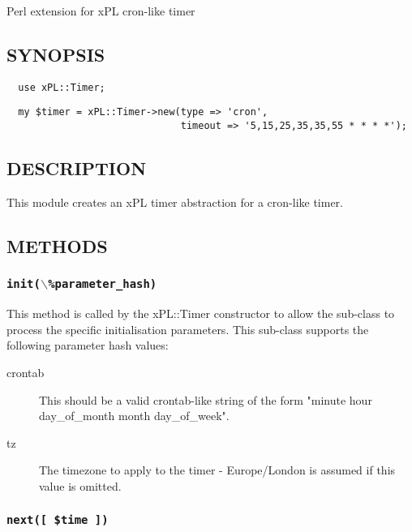 \documentclass[12pt,a4paper]{article}
\begin{document}
Perl extension for xPL cron-like timer

\subsection*{SYNOPSIS\label{xPL::Timer::cron_SYNOPSIS}}
\begin{verbatim}
  use xPL::Timer;
\end{verbatim}
\begin{verbatim}
  my $timer = xPL::Timer->new(type => 'cron',
                              timeout => '5,15,25,35,35,55 * * * *');
\end{verbatim}
\subsection*{DESCRIPTION\label{xPL::Timer::cron_DESCRIPTION}}


This module creates an xPL timer abstraction for a cron-like timer.

\subsection*{METHODS\label{xPL::Timer::cron_METHODS}}
\subsubsection*{\texttt{init($\backslash$\%parameter\_hash)}\label{xPL::Timer::cron_init_backslash_parameter_hash_}}


This method is called by the xPL::Timer constructor to allow the
sub-class to process the specific initialisation parameters.  This
sub-class supports the following parameter hash values:

\begin{description}

\item[{crontab}] \mbox{}

This should be a valid crontab-like string of the form
"minute hour day\_of\_month month day\_of\_week".


\item[{tz}] \mbox{}

The timezone to apply to the timer - Europe/London is assumed if this
value is omitted.

\end{description}
\subsubsection*{\texttt{next([ \$time ])}\label{xPL::Timer::cron_next_time_}}
\end{document}
